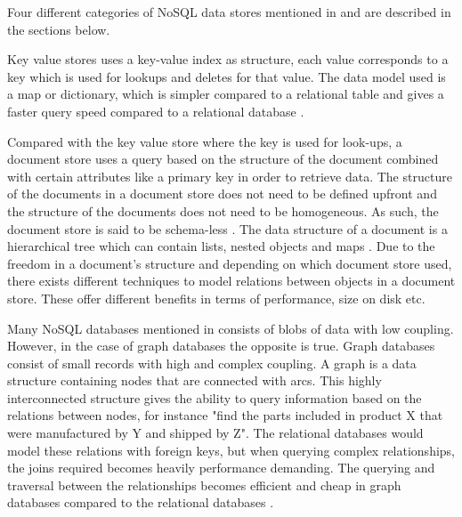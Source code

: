 
Four different categories of NoSQL data stores mentioned in \cite{Catell} and \cite{NoSQLDistilled} are described in the sections below.


Key value stores uses a key-value index as structure, each value corresponds to a key which is used for lookups and deletes for that value\cite{Catell}. The data model used is a map or dictionary, which is simpler compared to a relational table and gives a faster query speed compared to a relational database \cite{NoSQLSurvey}.

Compared with the key value store where the key is used for look-ups, a document store uses a query based on the structure of the document combined with certain attributes like a primary key in order to retrieve data. The structure of the documents in a document store does not need to be defined upfront and the structure of the documents does not need to be homogeneous. As such, the document store is said to be schema-less \cite{NoSQLDistilled}. The data structure of a document is a hierarchical tree which can contain lists, nested objects and maps \cite{Catell, NoSQLDistilled}. Due to the freedom in a document's structure and depending on which document store used, there exists different techniques to model relations between objects in a document store. These offer different benefits in terms of performance, size on disk etc. 

Many NoSQL databases mentioned in \cite{Catell} consists of blobs of data with low coupling. However, in the case of graph databases the opposite is true. Graph databases consist of small records with high and complex coupling. A graph is a data structure containing nodes that are connected with arcs\cite{NoSQLDistilled}. This highly interconnected structure gives the ability to query information based on the relations between nodes, for instance "find the parts included in product X that were manufactured by Y and shipped by Z". The relational databases would model these relations with foreign keys, but when querying complex relationships, the joins required becomes heavily performance demanding. The querying and traversal between the relationships becomes efficient and cheap in graph databases compared to the relational databases \cite{NoSQLDistilled}.

